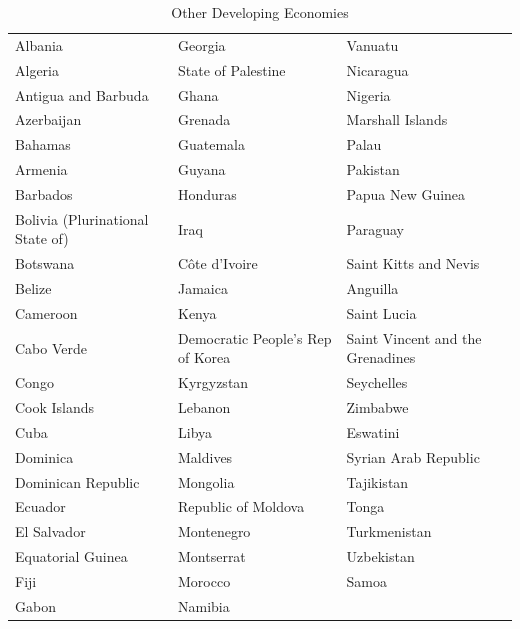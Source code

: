 \documentclass[
  openany, nofonts]{tufte-book}
\begin{document}
\begin{table}[!h]

\caption{\label{tab:c99-DEVOTtab}Other Developing Economies}
\centering
\fontsize{10}{12}\selectfont
\begin{tabular}[t]{lll}
\toprule
Albania & Georgia & Vanuatu\\
Algeria & State of Palestine & Nicaragua\\
Antigua and Barbuda & Ghana & Nigeria\\
Azerbaijan & Grenada & Marshall Islands\\
Bahamas & Guatemala & Palau\\
Armenia & Guyana & Pakistan\\
Barbados & Honduras & Papua New Guinea\\
Bolivia (Plurinational State of) & Iraq & Paraguay\\
Botswana & Côte d'Ivoire & Saint Kitts and Nevis\\
Belize & Jamaica & Anguilla\\
Cameroon & Kenya & Saint Lucia\\
Cabo Verde & Democratic People's Rep of Korea & Saint Vincent and the Grenadines\\
Congo & Kyrgyzstan & Seychelles\\
Cook Islands & Lebanon & Zimbabwe\\
Cuba & Libya & Eswatini\\
Dominica & Maldives & Syrian Arab Republic\\
Dominican Republic & Mongolia & Tajikistan\\
Ecuador & Republic of Moldova & Tonga\\
El Salvador & Montenegro & Turkmenistan\\
Equatorial Guinea & Montserrat & Uzbekistan\\
Fiji & Morocco & Samoa\\
Gabon & Namibia & \\
\bottomrule
\end{tabular}
\end{table}
\end{document}
